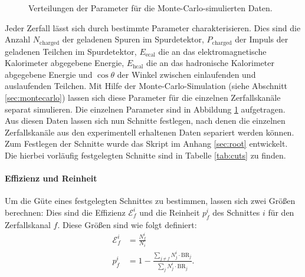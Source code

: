 \begin{figure}
	\caption[Verteilungen der Parameter für die Monte-Carlo-simulierten Daten]{Verteilungen der Parameter für die Monte-Carlo-simulierten Daten.}
	\label{fig:mc}
\end{figure}

Jeder Zerfall lässt sich durch bestimmte Parameter charakterisieren. Dies sind die Anzahl $N_\text{charged}$ der geladenen Spuren im Spurdetektor, $P_\text{charged}$ der Impuls der geladenen Teilchen im Spurdetektor, $E_\text{ecal}$ die an das elektromagnetische Kalorimeter abgegebene Energie, $E_\text{hcal}$ die an das hadronische Kalorimeter abgegebene Energie und $\cos\theta$ der Winkel zwischen einlaufenden und auslaufenden Teilchen. Mit Hilfe der Monte-Carlo-Simulation (siehe Abschnitt \ref{sec:montecarlo}) lassen sich diese Parameter für die einzelnen Zerfallskanäle separat simulieren. Die einzelnen Parameter sind in Abbildung \ref{fig:mc} aufgetragen.\\

Aus diesen Daten lassen sich nun Schnitte festlegen, nach denen die einzelnen Zerfallskanäle aus den experimentell erhaltenen Daten separiert werden können. Zum Festlegen der Schnitte wurde das Skript  im Anhang \ref{sec:root} entwickelt. Die hierbei vorläufig festgelegten Schnitte sind in Tabelle \ref{tab:cuts} zu finden.

\paragraph{Effizienz und Reinheit}
Um die Güte eines festgelegten Schnittes zu bestimmen, lassen sich zwei Größen berechnen: Dies sind die Effizienz $\mathcal{E}_f^i$ und die Reinheit $p_f^i$ des Schnittes $i$ für den Zerfallskanal $f$. Diese Größen sind wie folgt definiert:
\begin{align}
	\mathcal{E}_f^i&=\frac{N_f^i}{N_i}\\
	p_f^i&=1-\frac{\sum\limits_{j\neq f}N_j^i\cdot \mathrm{BR}_j}{\sum\limits_{j}N_j^i\cdot \mathrm{BR}_j}\text{.}
\end{align}

